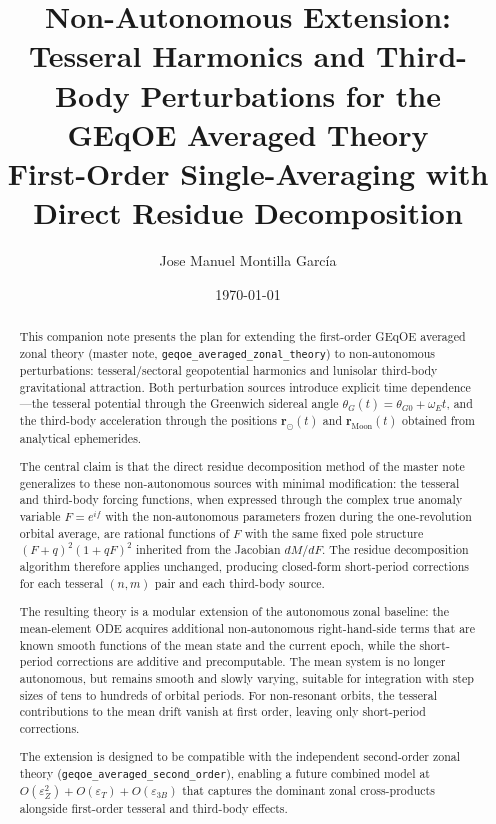 \documentclass[11pt]{article}
\title{Non-Autonomous Extension: Tesseral Harmonics and Third-Body
Perturbations for the GEqOE Averaged Theory\\
\large First-Order Single-Averaging with Direct Residue Decomposition}
\author{Jose Manuel Montilla Garc\'ia}
\date{\today}
\newcommand{\eps}{\varepsilon}
\newcommand{\master}{geqoe\_averaged\_zonal\_theory}
\newcommand{\secondorder}{geqoe\_averaged\_second\_order}
\begin{document}
\maketitle

\begin{abstract}
This companion note presents the plan for extending the first-order GEqOE
averaged zonal theory (master note, \texttt{\master{}}) to non-autonomous
perturbations: tesseral/sectoral geopotential harmonics and lunisolar
third-body gravitational attraction. Both perturbation sources introduce
explicit time dependence---the tesseral potential through the Greenwich
sidereal angle $\theta_G(t) = \theta_{G0} + \omega_E t$, and the third-body
acceleration through the positions $\bm r_\odot(t)$ and
$\bm r_{\text{Moon}}(t)$ obtained from analytical ephemerides.

The central claim is that the direct residue decomposition method of the
master note generalizes to these non-autonomous sources with minimal
modification: the tesseral and third-body forcing functions, when expressed
through the complex true anomaly variable $F = e^{if}$ with the
non-autonomous parameters frozen during the one-revolution orbital average,
are rational functions of $F$ with the same fixed pole structure
$(F+q)^2(1+qF)^2$ inherited from the Jacobian $dM/dF$. The residue
decomposition algorithm therefore applies unchanged, producing closed-form
short-period corrections for each tesseral $(n,m)$ pair and each
third-body source.

The resulting theory is a modular extension of the autonomous zonal
baseline: the mean-element ODE acquires additional non-autonomous
right-hand-side terms that are known smooth functions of the mean state and
the current epoch, while the short-period corrections are additive and
precomputable. The mean system is no longer autonomous, but remains smooth
and slowly varying, suitable for integration with step sizes of tens to
hundreds of orbital periods. For non-resonant orbits, the tesseral
contributions to the mean drift vanish at first order, leaving only
short-period corrections.

The extension is designed to be compatible with the independent second-order
zonal theory (\texttt{\secondorder{}}), enabling a future combined model at
$O(\eps_Z^2) + O(\eps_T) + O(\eps_{3B})$ that captures the dominant
zonal cross-products alongside first-order tesseral and third-body effects.
\end{abstract}

\tableofcontents
\end{document}
